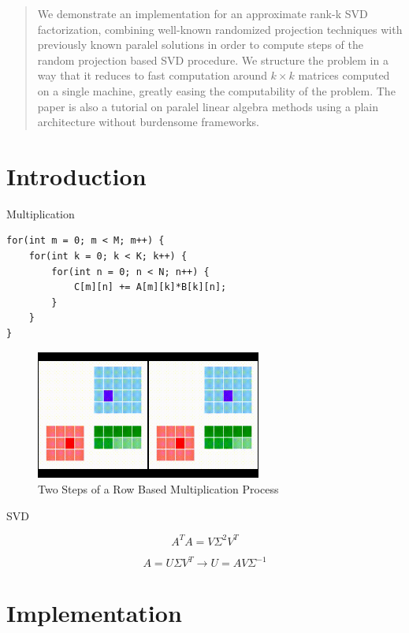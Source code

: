 \documentclass{article}
\begin{document}
\maketitle

\begin{abstract}
We demonstrate an implementation for an approximate rank-k SVD factorization,
combining well-known randomized projection techniques with previously known
paralel solutions in order to compute steps of the random projection based SVD
procedure. We structure the problem in a way that it reduces to fast computation
around $k \times k$ matrices computed on a single machine, greatly easing the
computability of the problem. The paper is also a tutorial on paralel linear
algebra methods using a plain architecture without burdensome frameworks.
\end{abstract}



\section{Introduction}


Multiplication

\begin{verbatim}
for(int m = 0; m < M; m++) {
    for(int k = 0; k < K; k++) {
        for(int n = 0; n < N; n++) {
            C[m][n] += A[m][k]*B[k][n];
        }
    }
}
\end{verbatim}

\begin{figure}[h]
  \centering
  \includegraphics[width=20em]{mult1.jpg}
  \caption{Two Steps of a Row Based Multiplication Process}
  \label{fig:mult1}
\end{figure}


SVD

$$
A^TA = V \Sigma^2 V^T 
$$

$$
A = U \Sigma V^T \to U = A V \Sigma^{-1}
$$

\section{Implementation}
\end{document}

